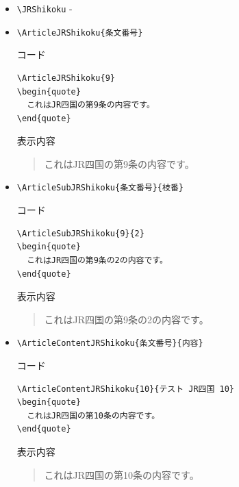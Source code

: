 \documentclass[oneside,10pt,a4paper]{jsarticle}
\begin{document}
  \begin{itemize}
    \item \verb|\JRShikoku| - \JRShikoku
    \item \verb|\ArticleJRShikoku{条文番号}|
      \begin{itembox}[l]{コード}
        \begin{verbatim}
\ArticleJRShikoku{9}
\begin{quote}
  これはJR四国の第9条の内容です。
\end{quote}\end{verbatim}
      \end{itembox}
      \begin{itembox}[l]{表示内容}
        \begin{quote}
          これはJR四国の第9条の内容です。
        \end{quote}
      \end{itembox}
    \item \verb|\ArticleSubJRShikoku{条文番号}{枝番}|
      \begin{itembox}[l]{コード}
        \begin{verbatim}
\ArticleSubJRShikoku{9}{2}
\begin{quote}
  これはJR四国の第9条の2の内容です。
\end{quote}\end{verbatim}
      \end{itembox}
      \begin{itembox}[l]{表示内容}
        \begin{quote}
          これはJR四国の第9条の2の内容です。
        \end{quote}
      \end{itembox}
    \newpage
    \item \verb|\ArticleContentJRShikoku{条文番号}{内容}|
      \begin{itembox}[l]{コード}
        \begin{verbatim}
\ArticleContentJRShikoku{10}{テスト JR四国 10}
\begin{quote}
  これはJR四国の第10条の内容です。
\end{quote}\end{verbatim}
      \end{itembox}
      \begin{itembox}[l]{表示内容}
        \begin{quote}
          これはJR四国の第10条の内容です。

\end{quote}
\end{itembox}
\end{itemize}
\end{document}
